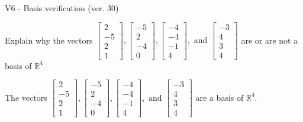 \begin{exercise}
  \begin{exerciseTitle}V6 - Basis verification (ver. 30)\end{exerciseTitle}
  \begin{exerciseStatement}
    Explain why the vectors \(\left[\begin{array}{r}
2 \\
-5 \\
2 \\
1
\end{array}\right] , \left[\begin{array}{r}
-5 \\
2 \\
-4 \\
0
\end{array}\right] , \left[\begin{array}{r}
-4 \\
-4 \\
-1 \\
4
\end{array}\right] , \text{ and } \left[\begin{array}{r}
-3 \\
4 \\
3 \\
4
\end{array}\right]\) are or are not a basis of \(\mathbb{R}^4\)	


  \end{exerciseStatement}
  \begin{exerciseAnswer}
   The vectors \(\left[\begin{array}{r}
2 \\
-5 \\
2 \\
1
\end{array}\right] , \left[\begin{array}{r}
-5 \\
2 \\
-4 \\
0
\end{array}\right] , \left[\begin{array}{r}
-4 \\
-4 \\
-1 \\
4
\end{array}\right] , \text{ and } \left[\begin{array}{r}
-3 \\
4 \\
3 \\
4
\end{array}\right]\) 
  	 are  a basis of \(\mathbb{R}^4\).
  


  \end{exerciseAnswer}
\end{exercise}